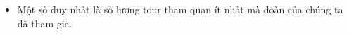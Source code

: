 \begin{itemize}
	\item Một số duy nhất là số lượng tour tham quan ít nhất mà đoàn của chúng ta đã tham gia.
\end{itemize}